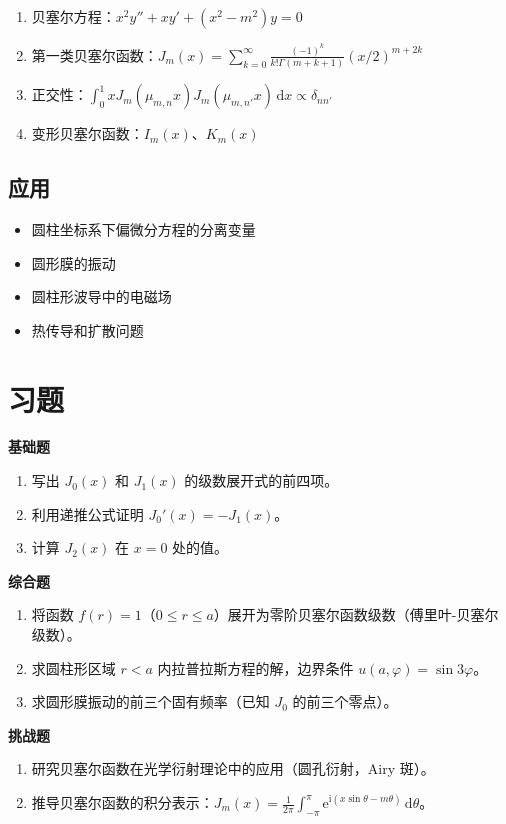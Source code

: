 \begin{enumerate}
    \item 贝塞尔方程：$x^2y'' + xy' + (x^2 - m^2)y = 0$
    \item 第一类贝塞尔函数：$J_m(x) = \sum_{k=0}^{\infty} \frac{(-1)^k}{k!\Gamma(m+k+1)}(x/2)^{m+2k}$
    \item 正交性：$\int_0^1 xJ_m(\mu_{m,n}x)J_m(\mu_{m,n'}x)\,\mathrm{d}x \propto \delta_{nn'}$
    \item 变形贝塞尔函数：$I_m(x)$、$K_m(x)$
\end{enumerate}

\subsection{应用}

\begin{itemize}
    \item 圆柱坐标系下偏微分方程的分离变量
    \item 圆形膜的振动
    \item 圆柱形波导中的电磁场
    \item 热传导和扩散问题
\end{itemize}

\section{习题}

\textbf{基础题}

\begin{enumerate}
    \item 写出 $J_0(x)$ 和 $J_1(x)$ 的级数展开式的前四项。
    
    \item 利用递推公式证明 $J_0'(x) = -J_1(x)$。
    
    \item 计算 $J_2(x)$ 在 $x = 0$ 处的值。
\end{enumerate}

\textbf{综合题}

\begin{enumerate}[resume]
    \item 将函数 $f(r) = 1$（$0 \leq r \leq a$）展开为零阶贝塞尔函数级数（傅里叶-贝塞尔级数）。
    
    \item 求圆柱形区域 $r < a$ 内拉普拉斯方程的解，边界条件 $u(a, \varphi) = \sin 3\varphi$。
    
    \item 求圆形膜振动的前三个固有频率（已知 $J_0$ 的前三个零点）。
\end{enumerate}

\textbf{挑战题}

\begin{enumerate}[resume]
    \item 研究贝塞尔函数在光学衍射理论中的应用（圆孔衍射，Airy 斑）。
    
    \item 推导贝塞尔函数的积分表示：$J_m(x) = \frac{1}{2\pi}\int_{-\pi}^{\pi} \mathrm{e}^{\mathrm{i}(x\sin\theta - m\theta)}\,\mathrm{d}\theta$。
\end{enumerate}
